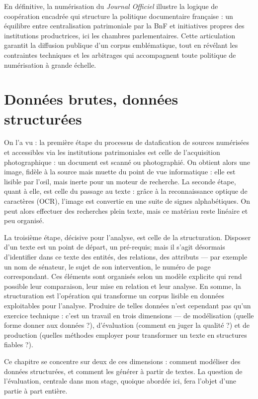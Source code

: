 En définitive, la numérisation du \emph{Journal Officiel} illustre la logique de coopération encadrée qui structure la politique documentaire française : un équilibre entre centralisation patrimoniale par la BnF et initiatives propres des institutions productrices, ici les chambres parlementaires. Cette articulation garantit la diffusion publique d’un corpus emblématique, tout en révélant les contraintes techniques et les arbitrages qui accompagnent toute politique de numérisation à grande échelle. 

\chapter{Données brutes, données structurées}

On l'a vu : la première étape du processus de datafication de sources numérisées et accessibles via les institutions patrimoniales est celle de l’acquisition photographique : un document est scanné ou photographié. On obtient alors une image, fidèle à la source mais muette du point de vue informatique : elle est lisible par l’œil, mais inerte pour un moteur de recherche. La seconde étape, quant à elle, est celle du passage au texte : grâce à la reconnaissance optique de caractères (OCR), l’image est convertie en une suite de signes alphabétiques. On peut alors effectuer des recherches plein texte, mais ce matériau reste linéaire et peu organisé.

La troisième étape, décisive pour l’analyse, est celle de la structuration. Disposer d’un texte est un point de départ, un pré-requis; mais il s'agit désormais d’identifier dans ce texte des entités, des relations, des attributs — par exemple un nom de sénateur, le sujet de son intervention, le numéro de page correspondant. Ces éléments sont organisés selon un modèle explicite qui rend possible leur comparaison, leur mise en relation et leur analyse. En somme, la structuration est l’opération qui transforme un corpus lisible en données exploitables pour l'analyse. Produire de telles données n’est cependant pas qu’un exercice technique : c’est un travail en trois dimensions — de modélisation (quelle forme donner aux données ?), d’évaluation (comment en juger la qualité ?) et de production (quelles méthodes employer pour transformer un texte en structures fiables ?).

Ce chapitre se concentre sur deux de ces dimensions : comment modéliser des données structurées, et comment les générer à partir de textes. La question de l’évaluation, centrale dans mon stage, quoique abordée ici, fera l’objet d’une partie à part entière.

